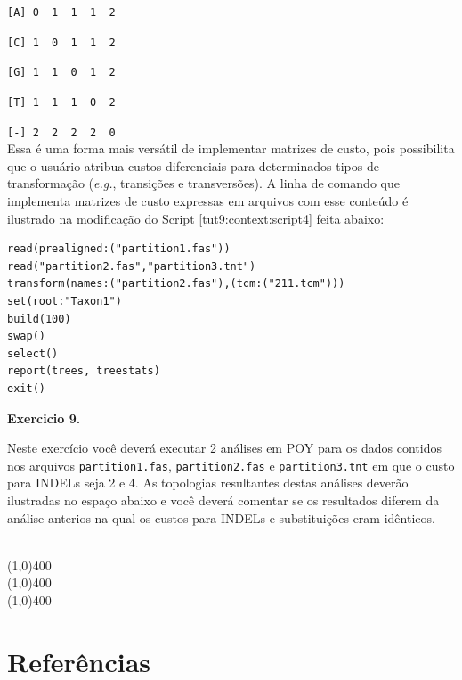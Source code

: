 \begin{refsection}
\texttt{[A]~0~~1~~1~~1~~2}

\texttt{[C]~1~~0~~1~~1~~2}

\texttt{[G]~1~~1~~0~~1~~2}

\texttt{[T]~1~~1~~1~~0~~2}

\texttt{[-]~2~~2~~2~~2~~0}\\

Essa é uma forma mais versátil de implementar matrizes de custo, pois possibilita que o usuário atribua custos diferenciais para determinados tipos de transformação (\textit{e.g.}, transições e transversões). A linha de comando que implementa matrizes de custo expressas em arquivos com esse conteúdo é ilustrado na modificação do Script \ref{tut9:context:script4} feita abaixo:\\

\begin{lstlisting}[caption= Modificação do arquivo partitions\_script.poy para implementar matriz de custo de transformação para a partição \texttt{partition2.fas}.,label=tut9:context:script4]
read(prealigned:("partition1.fas"))
read("partition2.fas","partition3.tnt")
transform(names:("partition2.fas"),(tcm:("211.tcm")))
set(root:"Taxon1")
build(100)
swap()
select()
report(trees, treestats)
exit()
\end{lstlisting}

\vspace{10pt}

\begin{blackBlock}{\textbf{Exercicio 9.}}\label{tut9:ex:9.3}

Neste exercício você deverá executar 2 análises em POY para os dados contidos nos arquivos \texttt{partition1.fas}, \texttt{partition2.fas} e \texttt{partition3.tnt} em que o custo para INDELs seja 2 e 4. As topologias resultantes destas análises deverão ilustradas no espaço abaixo e você deverá comentar se os resultados diferem da análise anterios na qual os custos para INDELs e substituições eram idênticos.

\end{blackBlock}

\begin{center}
\\
\vspace{30pt}
\line(1,0){400}\\
\line(1,0){400}\\
\line(1,0){400}\\
\end{center}



\section{Referências}\label{tut9:refs}
\printbibliography[heading=none]
\end{refsection}
%  
